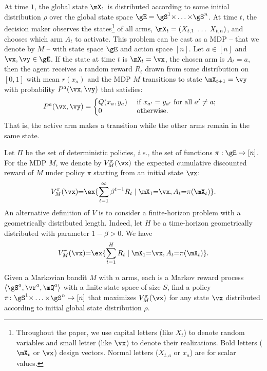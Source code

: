 At time $1$, the global  state $\mX_1$ is distributed according to some initial
distribution $\rho$ over the global state space $\gE =
\gS^1{\times}\dots{\times}\gS^n$.  At time $t$, the decision maker observes
the states\footnote{Throughout the paper, we use capital letters (like $X_t$)
to denote random variables and small letter (like $\vx$) to denote their
realizations. Bold letters ($\mX_t$ or $\vx$) design vectors. Normal letters
($X_{t,a}$ or $x_a$) are for scalar values.} of all arms,
$\mX_t=(X_{t,1}\ \dots\ X_{t,n})$, and chooses which arm $A_t$ to activate.
This problem can be cast as a MDP -- that we denote by $M$ -- with state
space $\gE$ and action space \([n]\). Let $a\in[n]$ and $\vx,\vy\in\gE$. If the
state at time $t$ is $\mX_t=\vx$, the chosen arm is $A_t=a$, then the agent
receives a random reward $R_t$ drawn from some distribution on \([0,1]\) with
mean \(r(x_a)\) and the MDP $M$ transitions to state $\mX_{t+1}=\vy$ with
probability \(P^a(\vx,\vy)\) that satisfies:
\begin{align}
    \label{eq:defP}
    P^a(\vx,\vy) 
    &= 
    \left\{
        \begin{array}{@{}ll@{}}
            Q(x_a,y_a) & \text{ if $x_{a'}=y_{a'}$ for all $a'\ne a$;}\\
            0 &\text{ otherwise}.
        \end{array}
    \right.
\end{align}
That is, the active arm makes a transition while the other arms remain in
the same state.

Let $\Pi$ be the set of deterministic policies, \emph{i.e.,} the set of
functions $\pi:\gE\mapsto[n]$.  For the MDP $M$, we denote by
$V_{M}^{\pi}(\vx)$ the expected cumulative discounted reward of ${M}$ under policy $\pi$  starting from an initial state $\vx$:
\[ V_{M}^\pi(\vx) {=}
\ex{\sum_{t=1}^{\infty} \beta^{t-1}R_t \mid \mX_1{=}\vx, A_t{=}\pi(\mX_t)}.\]
An alternative definition of $V$ is to consider a finite-horizon problem with a geometrically distributed length. Indeed, let $H$ be a time-horizon geometrically distributed with parameter $1-\beta>0$. We have
\begin{equation}
    \label{eq:V-vs_R}
    V_{M}^\pi(\vx)  {=}  \ex{\sum_{t=1}^{H} R_t \mid \mX_1{=}\vx, A_t{=}\pi(\mX_t)}.
\end{equation}

\begin{prob}
\label{pb:problem_1}
Given a Markovian bandit $M$ with $n$ arms, each is a Markov reward process $\langle\gS^a,\vr^a,\mQ^a\rangle$ with a finite state space of size $S$, find a policy $\pi\colon\gS^1{\times}\dots{\times}\gS^n\mapsto[n]$ that maximizes $V_{M}^\pi(\vx)$ for any state $\vx$ distributed according to initial global state distribution $\rho$.
\end{prob}

